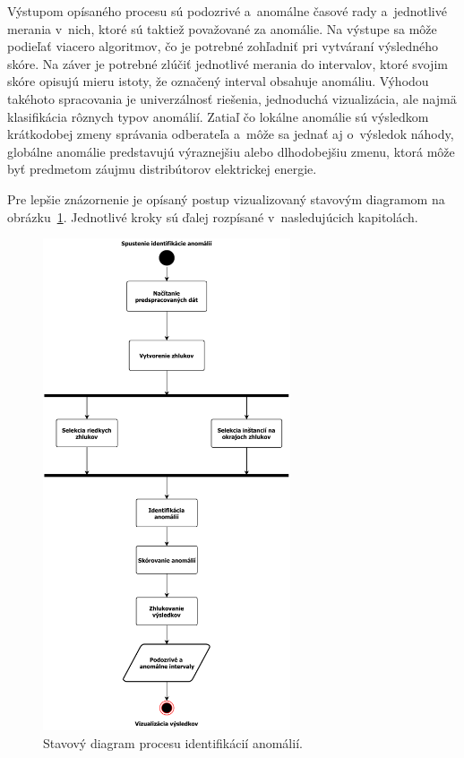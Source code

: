 \documentclass[a4paper,twoside,slovak,12pt,appendix]{article}
\begin{document}

Výstupom opísaného procesu sú podozrivé a~anomálne časové rady a~jednotlivé
merania v~nich, ktoré sú taktiež považované za anomálie. Na výstupe sa môže
podieľať viacero algoritmov, čo je potrebné zohľadniť pri vytváraní výsledného
skóre. Na záver je potrebné zlúčiť jednotlivé merania do intervalov, ktoré
svojim skóre opisujú mieru istoty, že označený interval obsahuje anomáliu.
Výhodou takéhoto spracovania je univerzálnosť riešenia, jednoduchá vizualizácia,
ale najmä klasifikácia rôznych typov anomálií. Zatiaľ čo lokálne anomálie sú
výsledkom krátkodobej zmeny správania odberateľa a~môže sa jednať aj o~výsledok
náhody, globálne anomálie predstavujú výraznejšiu alebo dlhodobejšiu zmenu,
ktorá môže byť predmetom záujmu distribútorov elektrickej energie.

Pre lepšie znázornenie je opísaný postup vizualizovaný stavovým diagramom na
obrázku~\ref{fig:state-diagram}. Jednotlivé kroky sú ďalej rozpísané
v~nasledujúcich kapitolách.

\begin{figure}[htbp]
  \centering
  \includegraphics[width=0.65\textwidth]{state_diagram.pdf}
  \caption{Stavový diagram procesu identifikácií anomálií.}
  \label{fig:state-diagram}
\end{figure}
\end{document}
